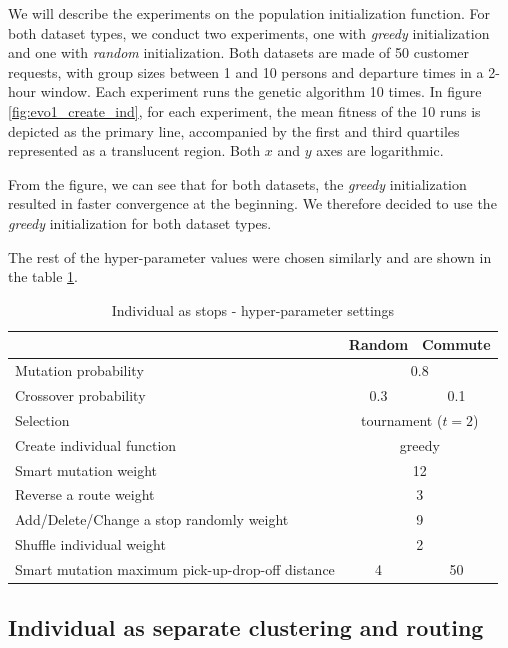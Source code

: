 \label{experiment_graph_description}
We will describe the experiments on the population initialization function. For both dataset types, we conduct two experiments, one with \textit{greedy} initialization and one with \textit{random} initialization. Both datasets are made of 50 customer requests, with group sizes between 1 and 10 persons and departure times in a 2-hour window. Each experiment runs the genetic algorithm 10 times. In figure \ref{fig:evo1_create_ind}, for each experiment, the mean fitness of the 10 runs is depicted as the primary line, accompanied by the first and third quartiles represented as a translucent region. Both $x$ and $y$ axes are logarithmic.

From the figure, we can see that for both datasets, the \textit{greedy} initialization resulted in faster convergence at the beginning. We therefore decided to use the \textit{greedy} initialization for both dataset types.

The rest of the hyper-parameter values were chosen similarly and are shown in the table \ref{tab:evo_stops_hyperparams}.

\begin{table}[h]
    \centering
    \begin{tabular}{lcc}
         & Random & Commute \\
        \hline
        Mutation probability & \multicolumn{2}{c}{0.8} \\
        Crossover probability & 0.3 & 0.1 \\
        Selection & \multicolumn{2}{c}{tournament ($t=2$)} \\
        Create individual function & \multicolumn{2}{c}{greedy} \\
        Smart mutation weight & \multicolumn{2}{c}{12} \\
        Reverse a route weight & \multicolumn{2}{c}{3} \\
        Add/Delete/Change a stop randomly weight & \multicolumn{2}{c}{9} \\
        Shuffle individual weight & \multicolumn{2}{c}{2} \\
        Smart mutation maximum pick-up-drop-off distance & 4 & 50 \\
    \end{tabular}
    \caption{Individual as stops - hyper-parameter settings}
    \label{tab:evo_stops_hyperparams}
\end{table}

\subsection{Individual as separate clustering and routing}

